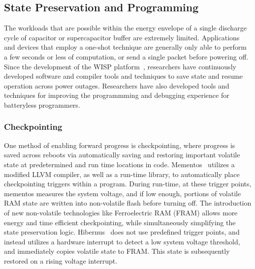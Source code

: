\subsection{State Preservation and Programming}
The workloads that are possible within the energy envelope of a single discharge cycle of capacitor or supercapacitor buffer are extremely limited.
Applications and devices that employ a one-shot technique are generally only able to perform a few seconds or less of computation, or send a single packet before powering off.
Since the development of the WISP platform~\cite{sample2008design}, researchers have continuously developed software and compiler tools and techniques to save state and resume operation across power outages.
Researchers have also developed tools and techniques for improving the programmming and debugging experience for batteryless programmers.

\subsubsection{Checkpointing}
One method of enabling forward progress is checkpointing, where
progress is saved across reboots via automatically saving and restoring important volatile state at predetermined and run time locations in code.
Mementos~\cite{ransford2012mementos} utilizes a modified LLVM compiler, as well as a run-time library, to automatically place checkpointing triggers within a program. During run-time, at these trigger points, mementos measures the system voltage, and if low enough, portions of volatile RAM state are written into non-volatile flash before turning off.
The introduction of new non-volatile technologies like Ferroelectric RAM (FRAM) allows more energy and time efficient checkpointing, while simultaneously simplifying the state preservation logic.
Hibernus~\cite{balsamo2014hibernus} does not use predefined trigger points, and instead utilizes a hardware interrupt to detect a low system voltage threshold, and immediately copies volatile state to FRAM. This state is subsequently restored on a rising voltage interrupt.

